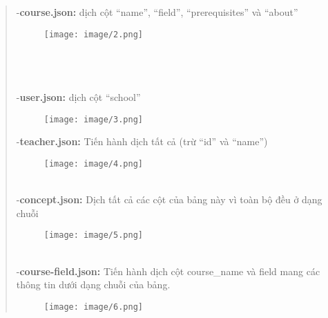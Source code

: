 \begin{quote}
-\textbf{course.json:} dịch cột “name”, “field”, “prerequisites” và “about”\\
\begin{figure}[h]
    \centering
    \texttt{[image: image/2.png]}
\end{figure}\\
\\
\\
-\textbf{user.json:} dịch cột “school”\\
\begin{figure}[h]
    \centering
    \texttt{[image: image/3.png]}
\end{figure}
\newpage
-\textbf{teacher.json:} Tiến hành dịch tất cả (trừ “id” và “name”)\\
\begin{figure}[h]
    \centering
    \texttt{[image: image/4.png]}
\end{figure}\\
-\textbf{concept.json:} Dịch tất cả các cột của bảng này vì toàn bộ đều ở dạng chuỗi\\
\begin{figure}[h]
    \centering
    \texttt{[image: image/5.png]}
\end{figure}\\
-\textbf{course-field.json:} Tiến hành dịch cột course\_name và field mang các thông tin dưới dạng chuỗi của bảng.\\
\begin{figure}[h]
    \centering
    \texttt{[image: image/6.png]}
\end{figure}
\end{quote}
